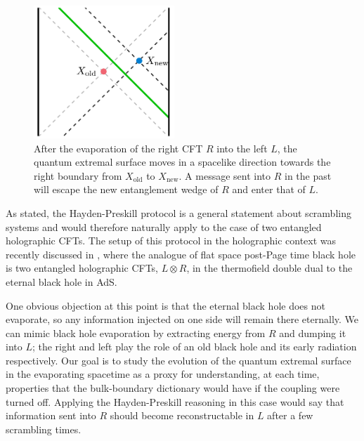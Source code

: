 \documentclass[12pt]{article}
\begin{document}
\begin{figure}
\begin{center}
\includegraphics[height=5cm]{HPprotocol.pdf}
\end{center}
\caption{After the evaporation of the right CFT $R$ into the left $L$, the quantum extremal surface moves in a spacelike direction towards the right boundary from $X_\mathrm{old}$ to $X_\mathrm{new}$. A message sent into $R$ in the past will escape the new entanglement wedge of $R$ and enter that of $L$.}
\label{fig:HPprotocol}
\end{figure}

As stated, the Hayden-Preskill protocol is a general statement about scrambling systems and would therefore naturally apply to the case of two entangled holographic CFTs. The setup of this protocol in the holographic context was recently discussed in \citep{Almheiri:2018xdw}, where the analogue of flat space post-Page time black hole is two entangled holographic CFTs,  $L \otimes R$,  in the thermofield double dual to the eternal black hole in AdS.

One obvious objection at this point is that the eternal black hole does not evaporate, so any information injected on one side will remain there eternally. We can mimic black hole evaporation by extracting energy from $R$ and dumping it into $L$; the right and left play the role of an old black hole and its early radiation respectively. Our goal is to study the evolution of the quantum extremal surface in the evaporating spacetime as a proxy for understanding, at each time, properties that the bulk-boundary dictionary would have if the coupling were turned off. Applying the Hayden-Preskill reasoning in this case would say that information sent into $R$ should become reconstructable in $L$ after a few scrambling times.
\end{document}
